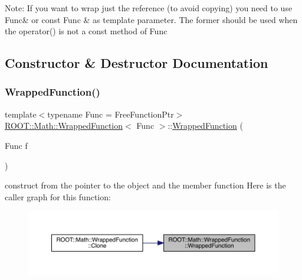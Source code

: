 Note\+: If you want to wrap just the reference (to avoid copying) you need to use Func\& or const Func \& as template parameter. The former should be used when the operator() is not a const method of Func 

\subsection{Constructor \& Destructor Documentation}
\mbox{\label{classROOT_1_1Math_1_1WrappedFunction_aa5dcde11a189a6fccb4262d341f31146}} 
\subsubsection{\texorpdfstring{WrappedFunction()}{WrappedFunction()}\hspace{0.1cm}{\footnotesize\ttfamily [1/2]}}
{\footnotesize\ttfamily template$<$typename Func  = Free\+Function\+Ptr$>$ \\
\mbox{\hyperlink{classROOT_1_1Math_1_1WrappedFunction}{R\+O\+O\+T\+::\+Math\+::\+Wrapped\+Function}}$<$ Func $>$\+::\mbox{\hyperlink{classROOT_1_1Math_1_1WrappedFunction}{Wrapped\+Function}} (\begin{DoxyParamCaption}\item[{Func}]{f }\end{DoxyParamCaption})\hspace{0.3cm}{\ttfamily [inline]}}

construct from the pointer to the object and the member function Here is the caller graph for this function\+:\nopagebreak
\begin{figure}[H]
\begin{center}
\leavevmode
\includegraphics[width=350pt]{de/d34/classROOT_1_1Math_1_1WrappedFunction_aa5dcde11a189a6fccb4262d341f31146_icgraph}
\end{center}
\end{figure}
\mbox{\label{classROOT_1_1Math_1_1WrappedFunction_aa5dcde11a189a6fccb4262d341f31146}} 
